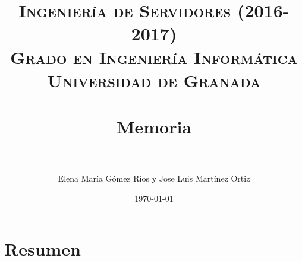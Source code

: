 


\title{	
\normalfont \normalsize 
\textsc{\textbf{Ingeniería de Servidores (2016-2017)} \\ Grado en Ingeniería Informática \\ Universidad de Granada} \\ [25pt] %
\horrule{0.5pt} \\[0.4cm] %
\huge Memoria \\ %
\horrule{2pt} \\[0.5cm] %
}

\author{Elena María Gómez Ríos y Jose Luis Martínez Ortiz} %

\date{\normalsize\today} %




\maketitle %

\newpage %

\tableofcontents %

\listoffigures

\listoftables

\newpage

 
\newpage


\section{Resumen}



